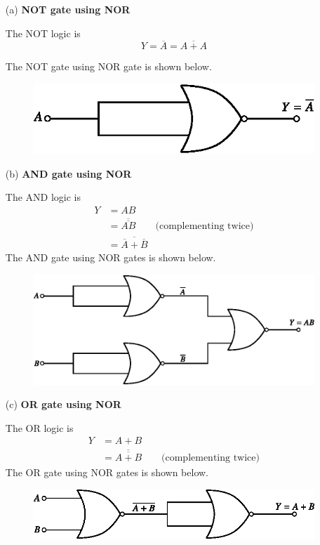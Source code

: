 \begin{solution}
\begin{itemize}
\item[(a)] {\bf NOT gate using NOR}

The NOT logic is
$$
Y=\overline{A}=\overline{A+A}
$$

\eject

The NOT gate using NOR gate is shown below.
\begin{figure}[H]
\centering
\includegraphics{chap6/fig104.eps}
\end{figure}

\item[(b)] {\bf AND gate using NOR}

The AND logic is
\begin{align*}
Y &= AB\\[3pt]
&= \overline{\overline{AB}}\qquad \text{(complementing twice)}\\[3pt]
&= \overline{\overline{A}+\overline{B}}
\end{align*}
The AND gate using NOR gates is shown below.
\begin{figure}[H]
\centering
\includegraphics{chap6/fig105.eps}
\end{figure}

\item[(c)] {\bf OR gate using NOR}

The OR logic is
\begin{align*}
Y &= A+B\\[3pt]
&= \overline{\overline{A+B}}\qquad \text{(complementing twice)}
\end{align*}
The OR gate using NOR gates is shown below.
\begin{figure}[H]
\centering
\includegraphics{chap6/fig106.eps}
\end{figure}


\end{itemize}
\end{solution}
